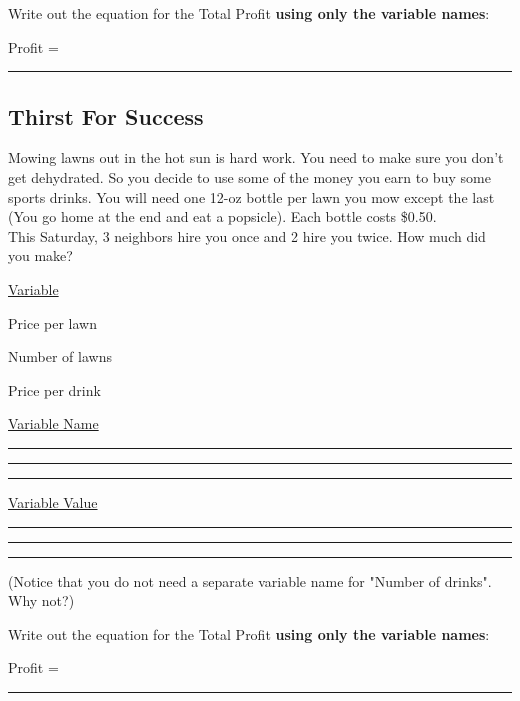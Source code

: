 \documentclass[paper=a4, fontsize=11pt]{scrartcl} %
\numberwithin{equation}{section} %
\numberwithin{figure}{section} %
\numberwithin{table}{section} %
\begin{document}
\begin{doublespacing}
Write out the equation for the Total Profit \textbf{using only the variable names}: 

\vspace{0.5cm}

Profit =   \rule{10cm}{0.15mm}


\end{doublespacing}

\pagebreak
\subsection{Thirst For Success}

Mowing lawns out in the hot sun is hard work.  You need to make sure you don't get dehydrated.  So you decide to use some of the money you earn to buy some sports drinks.  You will need one 12-oz bottle per lawn you mow except the last (You go home at the end and eat a popsicle).  Each bottle costs \$0.50.\\
	
This Saturday, 3 neighbors hire you once and 2 hire you twice.  How much did you make?

\begin{multicols}{3}

\begin{doublespacing}

\underline{Variable}

Price per lawn

Number of lawns

Price per drink

\underline{Variable Name}

\rule{2.5cm}{0.15mm}

\rule{2.5cm}{0.15mm}

\rule{2.5cm}{0.15mm}

\underline{Variable Value}

\rule{2.5cm}{0.15mm}

\rule{2.5cm}{0.15mm}

\rule{2.5cm}{0.15mm}

\end{doublespacing}
\end{multicols}

(Notice that you do not need a separate variable name for "Number of drinks".  Why not?)

\begin{doublespacing}
Write out the equation for the Total Profit \textbf{using only the variable names}: 

\vspace{0.5cm}

Profit =   \rule{10cm}{0.15mm}



\end{doublespacing}
\end{document}
